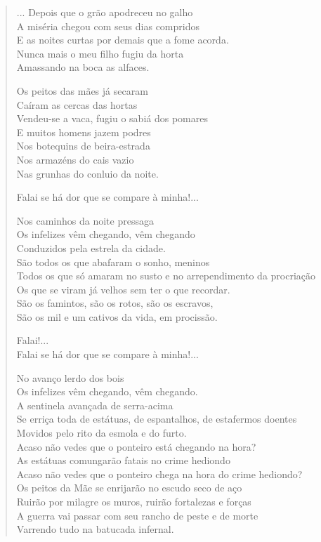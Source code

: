 \begin{verse}
... Depois que o grão apodreceu no galho\\
A miséria chegou com seus dias compridos\\
E as noites curtas por demais que a fome acorda.\\
Nunca mais o meu filho fugiu da horta\\
Amassando na boca as alfaces.

Os peitos das mães já secaram\\
Caíram as cercas das hortas\\
Vendeu-se a vaca, fugiu o sabiá dos pomares\\
E muitos homens jazem podres\\
Nos botequins de beira-estrada\\
Nos armazéns do cais vazio\\
Nas grunhas do conluio da noite.

Falai se há dor que se compare à minha!...

Nos caminhos da noite pressaga\\
Os infelizes vêm chegando, vêm chegando\\
Conduzidos pela estrela da cidade.\\
São todos os que abafaram o sonho, meninos\\
Todos os que só amaram no susto e no arrependimento da procriação\\
Os que se viram já velhos sem ter o que recordar.\\
São os famintos, são os rotos, são os escravos,\\
São os mil e um cativos da vida, em procissão.

Falai!...\\
Falai se há dor que se compare à minha!...

No avanço lerdo dos bois\\
Os infelizes vêm chegando, vêm chegando.\\
A sentinela avançada de serra-acima\\
Se erriça toda de estátuas, de espantalhos, de estafermos doentes\\
Movidos pelo rito da esmola e do furto.\\
Acaso não vedes que o ponteiro está chegando na hora?\\
As estátuas comungarão fatais no crime hediondo\\
Acaso não vedes que o ponteiro chega na hora do crime hediondo?\\
Os peitos da Mãe se enrijarão no escudo seco de aço\\
Ruirão por milagre os muros, ruirão fortalezas e forças\\
A guerra vai passar com seu rancho de peste e de morte\\
Varrendo tudo na batucada infernal.


\end{verse}
